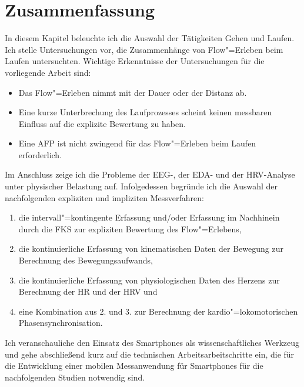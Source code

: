 

\section{Zusammenfassung} 

\label{sec:zusammenfassung_4}

In diesem Kapitel beleuchte ich die Auswahl der Tätigkeiten Gehen und Laufen. Ich stelle Untersuchungen vor, die Zusammenhänge von Flow"=Erleben beim Laufen untersuchten. Wichtige Erkenntnisse der Untersuchungen für die vorliegende Arbeit sind: 
\begin{itemize}

	\item Das Flow"=Erleben nimmt mit der Dauer oder der Distanz ab.

	\item Eine kurze Unterbrechung des Laufprozesses scheint keinen messbaren Einfluss auf die explizite Bewertung zu haben. 

	\item Eine \ac{AFP} ist nicht zwingend für das Flow"=Erleben beim Laufen erforderlich.
	
\end{itemize}

	Im Anschluss zeige ich die Probleme der \ac{EEG}-, der \ac{EDA}- und der \ac{HRV}-Analyse unter physischer Belastung auf. Infolgedessen begründe ich die Auswahl der nachfolgenden expliziten und impliziten Messverfahren:
	
\begin{enumerate}

	\item die intervall"=kontingente Erfassung und/oder Erfassung im Nachhinein durch die \ac{FKS} zur expliziten Bewertung des Flow"=Erlebens, 

	\item die kontinuierliche Erfassung von kinematischen Daten der Bewegung zur Berechnung des Bewegungsaufwands, 

	\item die kontinuierliche Erfassung von physiologischen Daten des Herzens zur Berechnung der \ac{HR} und der \ac{HRV} und 

	\item eine Kombination aus 2. und 3. zur Berechnung der kardio"=lokomotorischen Phasensynchronisation.
\end{enumerate}

Ich veranschauliche den Einsatz des Smartphones als wissenschaftliches Werkzeug und gehe abschließend kurz auf die technischen Arbeitsarbeitschritte ein, die für die Entwicklung einer mobilen Messanwendung für Smartphones für die nachfolgenden Studien notwendig sind.

